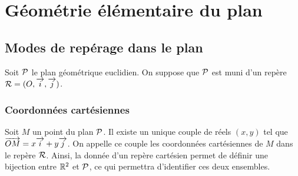 \chapter{Géométrie élémentaire du plan}
\label{chap:geomplan}
\minitoc
\minilof
\minilot
\section{Modes de repérage dans le plan}
\label{sec:modederep}
Soit $\P$ le plan géométrique euclidien. On suppose que $\P$ est muni d'un repère $\Rep=(O,\vi, \vj)$.
%
\subsection{Coordonnées cartésiennes}
\label{subsec:coordcart}
\begin{defdef}
  Soit $M$ un point du plan $\P$. Il existe un unique couple de réels $(x,y)$ tel que $\vect{OM}=x\vi+y\vj$. On appelle ce couple les coordonnées cartésiennes de $M$ dans le repère $\Rep$. Ainsi, la donnée d'un repère cartésien permet de définir une bijection entre $\R^2$ et $\P$, ce qui permettra d'identifier ces deux ensembles. %
\end{defdef}
%
